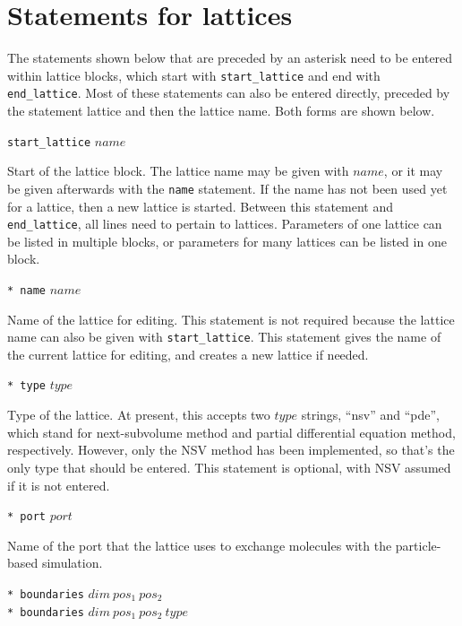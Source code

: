 \documentclass {scrbook}
\newcommand {\ttt} {\texttt}
\begin{document}
\section{Statements for lattices}

The statements shown below that are preceded by an asterisk need to be entered within lattice blocks, which start with \ttt{start\_lattice} and end with \ttt{end\_lattice}. Most of these statements can also be entered directly, preceded by the statement lattice and then the lattice name. Both forms are shown below.

\begin{description}

\item{\ttt{start\_lattice} $name$}

Start of the lattice block. The lattice name may be given with $name$, or it may be given afterwards with the \ttt{name} statement. If the name has not been used yet for a lattice, then a new lattice is started. Between this statement and \ttt{end\_lattice}, all lines need to pertain to lattices. Parameters of one lattice can be listed in multiple blocks, or parameters for many lattices can be listed in one block.

\item{\ttt{* name} $name$}

Name of the lattice for editing. This statement is not required because the lattice name can also be given with \ttt{start\_lattice}. This statement gives the name of the current lattice for editing, and creates a new lattice if needed.

\item{\ttt{* type} $type$}

Type of the lattice. At present, this accepts two $type$ strings, ``nsv'' and ``pde'', which stand for next-subvolume method and partial differential equation method, respectively. However, only the NSV method has been implemented, so that's the only type that should be entered. This statement is optional, with NSV assumed if it is not entered.

\item{\ttt{* port} $port$}

Name of the port that the lattice uses to exchange molecules with the particle-based simulation.

\item{\ttt{* boundaries} $dim\ pos_1\ pos_2$\\
\ttt{* boundaries} $dim\ pos_1\ pos_2\ type$}


\end{description}
\end{document}
